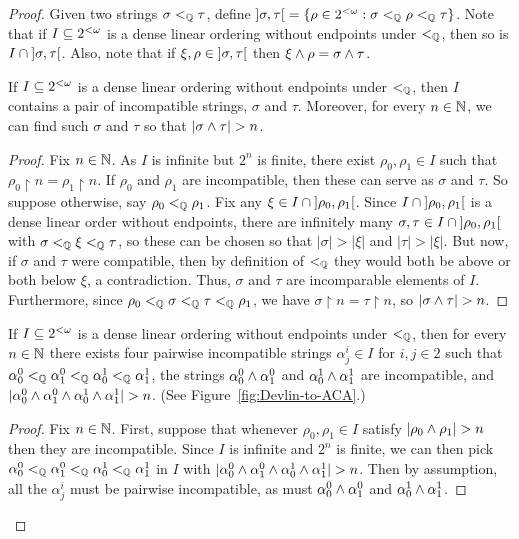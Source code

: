 \begin{proof}
  Given two strings $\sigma<_{\mathbb{Q}}\tau$, define $\interval[open]\sigma\tau = \{\rho \in \cantor:\sigma<_\Qb\rho<_\Qb\tau\}$. Note that if $I\subseteq{2^{<\omega}}$ is a dense linear ordering without endpoints under $<_{\mathbb{Q}}$, then so is $I\cap\interval[open]\sigma\tau$. Also, note that if $\xi,\rho \in \interval[open]\sigma\tau$ then $\xi \wedge \rho = \sigma \wedge \tau$.

  \begin{fact}\label{fact:dlo-blossom}
    If $I\subseteq{2^{<\omega}}$ is a dense linear ordering without endpoints under $<_{\mathbb{Q}}$, then $I$ contains a pair of incompatible strings, $\sigma$ and $\tau$. Moreover, for every $n\in\mathbb{N}$, we can find such $\sigma$ and $\tau$ so that $|\sigma\meet\tau|>n$.
  \end{fact}
  \begin{proof}
  	Fix $n \in \mathbb{N}$. As $I$ is infinite but $2^n$ is finite, there exist $\rho_0,\rho_1\in I$ such that $\rho_0\upharpoonright n=\rho_1\upharpoonright n$. If $\rho_0$ and $\rho_1$ are incompatible, then these can serve as $\sigma$ and $\tau$. So suppose otherwise, say $\rho_0 <_{\mathbb{Q}} \rho_1$. Fix any $\xi \in I\cap\interval[open]{\rho_0}{\rho_1}$. Since $I\cap\interval[open]{\rho_0}{\rho_1}$ is a dense linear order without endpoints, there are infinitely many $\sigma, \tau\in I\cap\interval[open]{\rho_0}{\rho_1}$ with $\sigma<_{\mathbb{Q}}\xi<_{\mathbb{Q}}\tau$, so these can be chosen so that $|\sigma|>|\xi|$ and $|\tau|>|\xi|$. But now, if $\sigma$ and $\tau$ were compatible, then by definition of $<_{\mathbb{Q}}$ they would both be above or both below $\xi$, a contradiction. Thus, $\sigma$ and $\tau$ are incomparable elements of $I$. Furthermore, since $\rho_0<_{\mathbb{Q}}\sigma <_{\mathbb{Q}} \tau<_{\mathbb{Q}}\rho_1$, we have $\sigma\upharpoonright n = \tau\upharpoonright n$, so $|\sigma\meet\tau|>n$.
  \end{proof}
  \begin{fact}\label{fact:dlo-blossom2}
    If $I\subseteq{2^{<\omega}}$ is a dense linear ordering without endpoints under $<_{\mathbb{Q}}$, then for every $n\in\mathbb{N}$ there exists four pairwise incompatible strings $\alpha^i_j\in I$ for $i,j\in 2$ such that $\alpha^0_0<_{\mathbb{Q}}\alpha^0_1<_{\mathbb{Q}}\alpha^1_0<_{\mathbb{Q}}\alpha^1_1$, the strings $\alpha^0_0\wedge\alpha^0_1$ and $\alpha^1_0\wedge\alpha^1_1$ are incompatible, and $|\alpha^0_{0}\meet\alpha^0_{1}\meet\alpha^1_{0}\meet\alpha^1_{1}|>n$. (See Figure~\ref{fig:Devlin-to-ACA}.)
  \end{fact}
  \begin{proof}
  		Fix $n \in \mathbb{N}$. First, suppose that whenever $\rho_0,\rho_1 \in I$ satisfy $|\rho_0\meet\rho_1|>n$ then they are incompatible. Since $I$ is infinite and $2^n$ is finite, we can then pick $\alpha^0_0 <_{\mathbb{Q}} \alpha^0_1 <_{\mathbb{Q}} \alpha^1_0 <_{\mathbb{Q}} \alpha^1_1$ in $I$ with $|\alpha^0_{0}\meet\alpha^0_{1}\meet\alpha^1_{0}\meet\alpha^1_{1}|>n$. Then by assumption, all the $\alpha^i_j$ must be pairwise incompatible, as must $\alpha^0_0 \wedge \alpha^0_1$ and $\alpha^1_0 \wedge \alpha^1_1$.


\end{proof}
\end{proof}
